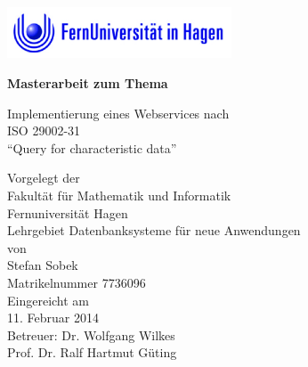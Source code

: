 \begin{titlepage}
\vspace{4em}
\begin{center}
	\includegraphics[width=0.50\textwidth]{images/feulogo.jpg}
\end{center}
\center

 \Large{\textsf{\textbf{Masterarbeit zum Thema}}}
 \vspace{1em}

\Huge{\textsf{Implementierung eines Webservices nach \\ ISO 29002-31 \\  \enquote{Query for characteristic data}}}
\vspace{1em}
\\


\vspace{1em}

{\normalsize 
\textsf{
Vorgelegt der\\
Fakultät für Mathematik und Informatik\\Fernuniversität Hagen\\Lehrgebiet Datenbanksysteme für neue Anwendungen
}
}
\vspace{2em}
\\

\normalsize{
	\textsf{
	von \\
Stefan Sobek \\ 
Matrikelnummer 7736096 \\
\vspace{2em}
Eingereicht am \\  
11. Februar 2014
\vspace{3em}
\\
Betreuer: Dr. Wolfgang Wilkes\\
Prof. Dr. Ralf Hartmut Güting \\
}
}
\end{titlepage}
